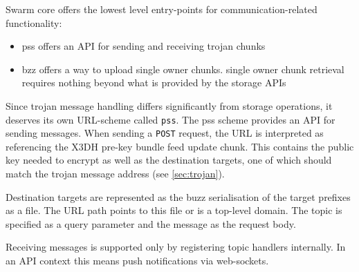 Swarm core offers the lowest level entry-points for communication-related functionality:

\begin{itemize}[noitemsep]
    \item pss offers an API for sending and receiving trojan chunks
    \item bzz offers a way to upload single owner chunks. single owner chunk retrieval requires nothing beyond what is provided by the storage APIs
\end{itemize}







Since trojan message handling differs significantly from storage operations, it deserves its  own URL-scheme called \lstinline{pss}. The pss scheme provides an API for sending messages. When sending a \lstinline{POST} request, the URL is interpreted as referencing the X3DH pre-key bundle feed update chunk. This contains the public key needed to encrypt as well as the destination targets,    one of which should match the trojan message address (see \ref{sec:trojan}). 

Destination targets are represented as the buzz serialisation of the target prefixes as a file. The URL path points to this file or is a top-level domain. The topic is specified as a query parameter and the message as the request body.

Receiving messages is supported only by registering topic handlers internally. In an API context this means push notifications via web-sockets.

